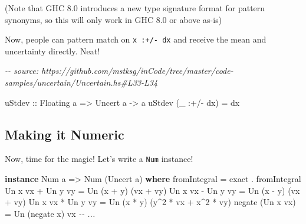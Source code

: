 \documentclass[]{article}
\newenvironment{Shaded}{}{}
\newcommand{\CommentTok}[1]{\textcolor[rgb]{0.38,0.63,0.69}{\textit{#1}}}
\newcommand{\DataTypeTok}[1]{\textcolor[rgb]{0.56,0.13,0.00}{#1}}
\newcommand{\DecValTok}[1]{\textcolor[rgb]{0.25,0.63,0.44}{#1}}
\newcommand{\FunctionTok}[1]{\textcolor[rgb]{0.02,0.16,0.49}{#1}}
\newcommand{\KeywordTok}[1]{\textcolor[rgb]{0.00,0.44,0.13}{\textbf{#1}}}
\newcommand{\NormalTok}[1]{#1}
\newcommand{\OperatorTok}[1]{\textcolor[rgb]{0.40,0.40,0.40}{#1}}
\newcommand{\OtherTok}[1]{\textcolor[rgb]{0.00,0.44,0.13}{#1}}
\begin{document}
(Note that GHC 8.0 introduces a new type signature format for pattern synonyms,
so this will only work in GHC 8.0 or above as-is)

Now, people can pattern match on \texttt{x\ :+/-\ dx} and receive the mean and
uncertainty directly. Neat!

\begin{Shaded}
\begin{Highlighting}[]
\CommentTok{{-}{-} source: https://github.com/mstksg/inCode/tree/master/code{-}samples/uncertain/Uncertain.hs\#L33{-}L34}

\OtherTok{uStdev ::} \DataTypeTok{Floating}\NormalTok{ a }\OtherTok{=\textgreater{}} \DataTypeTok{Uncert}\NormalTok{ a }\OtherTok{{-}\textgreater{}}\NormalTok{ a}
\NormalTok{uStdev (\_ }\OperatorTok{:+/{-}}\NormalTok{ dx) }\OtherTok{=}\NormalTok{ dx}
\end{Highlighting}
\end{Shaded}

\subsection{Making it Numeric}\label{making-it-numeric}

Now, time for the magic! Let's write a \texttt{Num} instance!

\begin{Shaded}
\begin{Highlighting}[]
\KeywordTok{instance} \DataTypeTok{Num}\NormalTok{ a }\OtherTok{=\textgreater{}} \DataTypeTok{Num}\NormalTok{ (}\DataTypeTok{Uncert}\NormalTok{ a) }\KeywordTok{where}
    \FunctionTok{fromIntegral}      \OtherTok{=}\NormalTok{ exact }\OperatorTok{.} \FunctionTok{fromIntegral}
    \DataTypeTok{Un}\NormalTok{ x vx }\OperatorTok{+} \DataTypeTok{Un}\NormalTok{ y vy }\OtherTok{=} \DataTypeTok{Un}\NormalTok{ (x }\OperatorTok{+}\NormalTok{ y)    (vx }\OperatorTok{+}\NormalTok{ vy)}
    \DataTypeTok{Un}\NormalTok{ x vx }\OperatorTok{{-}} \DataTypeTok{Un}\NormalTok{ y vy }\OtherTok{=} \DataTypeTok{Un}\NormalTok{ (x }\OperatorTok{{-}}\NormalTok{ y)    (vx }\OperatorTok{+}\NormalTok{ vy)}
    \DataTypeTok{Un}\NormalTok{ x vx }\OperatorTok{*} \DataTypeTok{Un}\NormalTok{ y vy }\OtherTok{=} \DataTypeTok{Un}\NormalTok{ (x }\OperatorTok{*}\NormalTok{ y)    (y}\OperatorTok{\^{}}\DecValTok{2} \OperatorTok{*}\NormalTok{ vx }\OperatorTok{+}\NormalTok{ x}\OperatorTok{\^{}}\DecValTok{2} \OperatorTok{*}\NormalTok{ vy)}
    \FunctionTok{negate}\NormalTok{ (}\DataTypeTok{Un}\NormalTok{ x vx)  }\OtherTok{=} \DataTypeTok{Un}\NormalTok{ (}\FunctionTok{negate}\NormalTok{ x) vx}
    \CommentTok{{-}{-} ...}
\end{Highlighting}
\end{Shaded}
\end{document}
